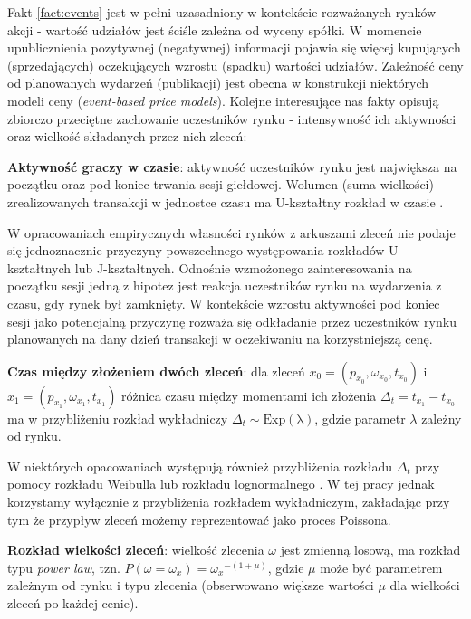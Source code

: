Fakt \ref{fact:events} jest w pełni uzasadniony w kontekście rozważanych rynków akcji - wartość udziałów jest ściśle zależna od wyceny spółki. W momencie upublicznienia pozytywnej (negatywnej) informacji pojawia się więcej kupujących (sprzedających) oczekujących wzrostu (spadku) wartości udziałów. Zależność ceny od planowanych wydarzeń (publikacji) jest obecna w konstrukcji niektórych modeli ceny (\textit{event-based price models}).
Kolejne interesujące nas fakty opisują zbiorczo przeciętne zachowanie uczestników rynku - intensywność ich aktywności oraz wielkość składanych przez nich zleceń: 
\begin{fact}\label{fact:ushapeddist}
\textbf{Aktywność graczy w czasie}: aktywność uczestników rynku jest największa na początku oraz pod koniec trwania sesji giełdowej. Wolumen (suma wielkości) zrealizowanych transakcji w jednostce czasu ma U-kształtny rozkład w czasie \cite{bouchaud_bonart_donier_gould_2018}.
\end{fact}

W opracowaniach empirycznych własności rynków z arkuszami zleceń nie podaje się jednoznacznie przyczyny powszechnego występowania rozkładów U-kształtnych lub J-kształtnych. Odnośnie wzmożonego zainteresowania na początku sesji jedną z hipotez jest reakcja uczestników rynku na wydarzenia z czasu, gdy rynek był zamknięty. W kontekście wzrostu aktywności pod koniec sesji jako potencjalną przyczynę rozważa się odkładanie przez uczestników rynku planowanych na dany dzień transakcji w oczekiwaniu na korzystniejszą cenę. 
\begin{fact}\label{fact:interarrivals}
\textbf{Czas między złożeniem dwóch zleceń}: dla zleceń $x_0 = (p_{x_0}, \omega_{x_0}, t_{x_0})$ i $x_1 = (p_{x_1}, \omega_{x_1}, t_{x_1})$ różnica czasu między momentami ich złożenia $\Delta_t = t_{x_1} - t_{x_0}$ ma w przybliżeniu rozkład wykładniczy $\Delta_t \sim \mathrm{Exp(\lambda)}$, gdzie parametr $\lambda$ zależny od rynku. 
\end{fact}

W niektórych opacowaniach występują również przybliżenia rozkładu $\Delta_t$ przy pomocy rozkładu Weibulla lub rozkładu lognormalnego \cite{abergel_lob}. W tej pracy jednak korzystamy wyłącznie z przybliżenia rozkładem wykładniczym, zakładając przy tym że przypływ zleceń możemy reprezentować jako proces Poissona.

\begin{fact}\label{fact:ordersize}
\textbf{Rozkład wielkości zleceń}: wielkość zlecenia $\omega$ jest zmienną losową, ma rozkład typu \textit{power law}, tzn. $P(\omega = \omega_x) = {\omega_x}^{-(1+\mu)}$, gdzie $\mu$ może być parametrem zależnym od rynku i typu zlecenia (obserwowano większe wartości $\mu$ dla wielkości zleceń po każdej cenie)\cite{bouchaud_bonart_donier_gould_2018}.
\end{fact}

